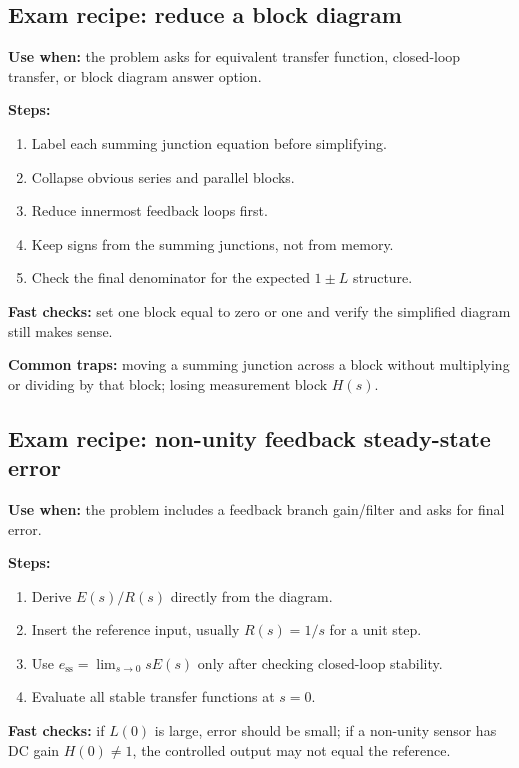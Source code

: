 \subsection{Exam recipe: reduce a block diagram}

\textbf{Use when:} the problem asks for equivalent transfer function, closed-loop transfer, or block diagram answer option.

\textbf{Steps:}
\begin{enumerate}
\item Label each summing junction equation before simplifying.
\item Collapse obvious series and parallel blocks.
\item Reduce innermost feedback loops first.
\item Keep signs from the summing junctions, not from memory.
\item Check the final denominator for the expected \(1\pm L\) structure.
\end{enumerate}

\textbf{Fast checks:} set one block equal to zero or one and verify the simplified diagram still makes sense.

\textbf{Common traps:} moving a summing junction across a block without multiplying or dividing by that block; losing measurement block \(H(s)\).

\subsection{Exam recipe: non-unity feedback steady-state error}

\textbf{Use when:} the problem includes a feedback branch gain/filter and asks for final error.

\textbf{Steps:}
\begin{enumerate}
\item Derive \(E(s)/R(s)\) directly from the diagram.
\item Insert the reference input, usually \(R(s)=1/s\) for a unit step.
\item Use \(e_{\mathrm{ss}}=\lim_{s\to0}sE(s)\) only after checking closed-loop stability.
\item Evaluate all stable transfer functions at \(s=0\).
\end{enumerate}

\textbf{Fast checks:} if \(L(0)\) is large, error should be small; if a non-unity sensor has DC gain \(H(0)\neq 1\), the controlled output may not equal the reference.

